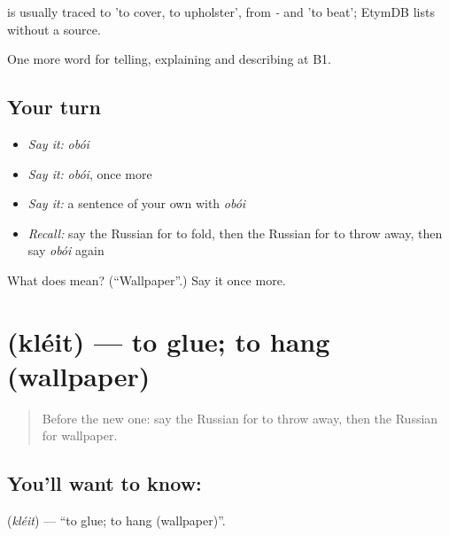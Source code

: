 \begin{cousinweb}
\emph{} is usually traced to \emph{} 'to cover, to upholster', from \emph{-} and \emph{} 'to beat'; EtymDB lists \emph{} without a source.
\end{cousinweb}

\begin{grammarlens}[title={What you've built}]
One more word for telling, explaining and describing at B1.
\end{grammarlens}

\subsection*{Your turn}
\begin{itemize}
\raggedright
  \item \emph{Say it:} \emph{obói}
  \item \emph{Say it:} \emph{obói}, once more
  \item \emph{Say it:} a sentence of your own with \emph{obói}
  \item \emph{Recall:} say the Russian for to fold, then the Russian for to throw away, then say \emph{obói} again
\end{itemize}

\begin{tcolorbox}[breakable,colback=teal!4,colframe=teal!35!black,title={Before you move on}]
What does  mean? (\textquotedblleft{}Wallpaper\textquotedblright{}.) Say it once more.
\end{tcolorbox}
\section[\texorpdfstring{\ru{клеить} (kléit)}{клеить (kléit)}]{ (kléit) — to glue; to hang (wallpaper)}

\label{lesson:RU-C532-kleit}



\begin{quote}
Before the new one: say the Russian for to throw away, then the Russian for wallpaper.
\end{quote}

\subsection*{You'll want to know: }
\textbf{} (\emph{kléit}) — \textquotedblleft{}to glue; to hang (wallpaper)\textquotedblright{}.

